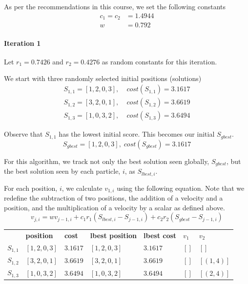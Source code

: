 \documentclass[a4paper]{article}
\newcommand{\subsubsubsection}[1]{\paragraph{#1} \mbox{}}
\begin{document}
As per the recommendations in this course, we set the following constants
\begin{align*}
c_1 = c_2 & = 1.4944 \\
w & = 0.792
\end{align*}

\subsubsubsection{Iteration 1}

Let $r_1 = 0.7426$ and $r_2 = 0.4276$ as random constants for this iteration.

We start with three randomly selected initial positions (solutions)
\begin{align*}
S_{1,1} = [1, 2, 0, 3], & \; cost(S_{1,1}) = 3.1617 \\
S_{1,2} = [3, 2, 0, 1], & \; cost(S_{1,2}) = 3.6619 \\
S_{1,3} = [1, 0, 3, 2], & \; cost(S_{1,3}) = 3.6494
\end{align*}

Observe that $S_{1,1}$ has the lowest initial score. This becomes our initial $S_\mathit{gbest}$.
$$S_\mathit{gbest} = [1, 2, 0, 3], \; cost(S_\mathit{gbest}) = 3.1617$$

For this algorithm, we track not only the best solution seen globally,
$S_\mathit{gbest}$, but the best solution seen by each particle, $i$, as
$S_{\mathit{lbest}, i}$.

For each position, $i$, we calculate
$v_{1,i}$ using the following equation. Note that we redefine the subtraction of
two positions, the addition of a velocity and a position, and the multiplication
of a velocity by a scalar as defined above\cite{DiscretePSO}.
$$
v_{j,i} =
  w v_{j-1, i} +
  c_1 r_1 (S_{\mathit{lbest}, i} - S_{j-1, i}) +
  c_2 r_2 (S_\mathit{gbest} - S_{j-1, i})
$$

\begin{center}
\begin{tabular}{lllllll}
          & \textbf{position} & \textbf{cost} & \textbf{lbest position} & \textbf{lbest cost} & $v_1$ & $v_2$            \\
$S_{1,1}$ & $[1, 2, 0, 3]$    & $3.1617$      & $[1, 2, 0, 3]$          & $3.1617$            & $[]$  & $[]      $ \\
$S_{1,2}$ & $[3, 2, 0, 1]$    & $3.6619$      & $[3, 2, 0, 1]$          & $3.6619$            & $[]$  & $[(1, 4)]$ \\
$S_{1,3}$ & $[1, 0, 3, 2]$    & $3.6494$      & $[1, 0, 3, 2]$          & $3.6494$            & $[]$  & $[(2, 4)]$ \\
\end{tabular}
\end{center}
\vspace{1.5em}
\end{document}
